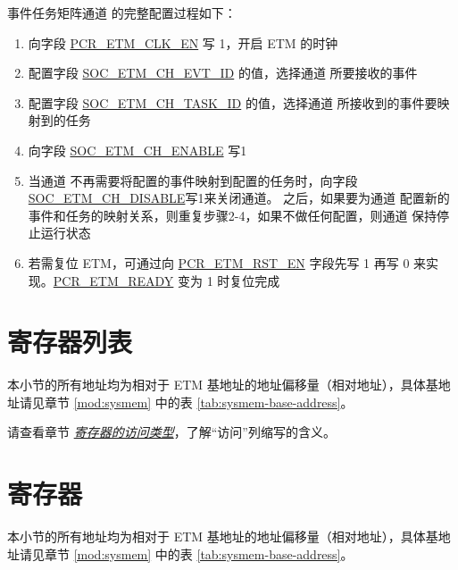\documentclass[main\_\_CN.tex]{subfiles}
\begin{document}
事件任务矩阵通道 的完整配置过程如下：
\begin{enumerate}
    \item 向字段 \hyperref[fielddesc:PCRETMCLKEN]{PCR\_ETM\_CLK\_EN} 写 1，开启 ETM 的时钟
    \item 配置字段 \hyperref[fielddesc:SOCETMCH0EVTID]{SOC\_ETM\_CH\_EVT\_ID} 的值，选择通道 所要接收的事件
    \item 配置字段 \hyperref[fielddesc:SOCETMCH0TASKID]{SOC\_ETM\_CH\_TASK\_ID} 的值，选择通道 所接收到的事件要映射到的任务
    \item 向字段 \hyperref[fielddesc:SOCETMCHENABLE0]{SOC\_ETM\_CH\_ENABLE} 写1
    \item 当通道 不再需要将配置的事件映射到配置的任务时，向字段\hyperref[fielddesc:SOCETMCHDISABLE0]{SOC\_ETM\_CH\_DISABLE}写1来关闭通道。 之后，如果要为通道 配置新的事件和任务的映射关系，则重复步骤2-4，如果不做任何配置，则通道 保持停止运行状态
    \item 若需复位 ETM，可通过向 \hyperref[fielddesc:PCRETMRSTEN]{PCR\_ETM\_RST\_EN} 字段先写 1 再写 0 来实现。\hyperref[fielddesc:PCRETMREADY]{PCR\_ETM\_READY} 变为 1 时复位完成
\end{enumerate}





\clearpage
\hypertarget{evntaskmatrix-reg-summ}{}
\section{寄存器列表}
\label{sec:evntaskmatrix-reg-summ}

本小节的所有地址均为相对于 ETM 基地址的地址偏移量（相对地址），具体基地址请见章节 \ref{mod:sysmem} \textit{} 中的表 \ref{tab:sysmem-base-address}。

请查看章节 \hyperref[glossary-access-types]{\textit{寄存器的访问类型}}，了解“访问”列缩写的含义。






\clearpage
\section{寄存器}

本小节的所有地址均为相对于 ETM 基地址的地址偏移量（相对地址），具体基地址请见章节 \ref{mod:sysmem} \textit{} 中的表 \ref{tab:sysmem-base-address}。


\end{document}
